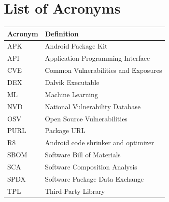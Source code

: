 \chapter*{List of Acronyms}

\begin{longtable}{p{}p{}}
\textbf{Acronym} & \textbf{Definition}\\
\hline
APK & Android Package Kit\\
API & Application Programming Interface\\
CVE & Common Vulnerabilities and Exposures\\
DEX & Dalvik Executable\\
ML & Machine Learning\\
NVD & National Vulnerability Database\\
OSV & Open Source Vulnerabilities\\
PURL & Package URL\\
R8 & Android code shrinker and optimizer\\
SBOM & Software Bill of Materials\\
SCA & Software Composition Analysis\\
SPDX & Software Package Data Exchange\\
TPL & Third-Party Library\\
\end{longtable}

